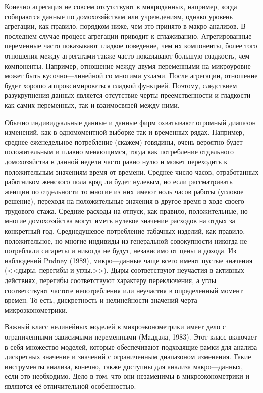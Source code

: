 	
	Конечно агрегация не совсем отсутствуют в микроданных, например, когда собираются данные по домохозяйствам или учреждениям, однако уровень агрегации, как правило, порядком ниже, чем это принято в макро анализов. В последнем случае процесс агрегации приводит к сглаживанию. Агрегированные переменные часто показывают гладкое поведение, чем их компоненты, более того отношения между агрегатами также часто показывают большую гладкость, чем компоненты. Например, отношение между двумя переменными на микроуровне может быть кусочно---линейной со многими узлами. После агрегации, отношение будет хорошо аппроксимироваться гладкой функцией. Поэтому, следствием разукрупнения данных является отсутствие черты преемственности и гладкости как самих переменных, так и взаимосвязей между ними.
	
	
	Обычно индивидуальные данные и данные фирм охватывают огромный диапазон изменений, как в одномоментной выборке так и временных рядах. Например, среднее еженедельное потребление (скажем) говядины, очень вероятно будет положительным и плавно меняющимся, тогда как потребление отдельного домохозяйства в данной недели часто равно нулю и может переходить к положительным значениям время от времени. Среднее число часов, отработанных работником женского пола вряд ли будет нулевым, но если рассматривать женщин по отдельности то многие из них имеют ноль часов работы (угловое решение), переходя на положительные значения в другое время в ходе своего трудового стажа. Средние расходы на отпуск, как правило, положительные, но многие домохозяйства могут иметь нулевое значение расходов на отдых за конкретный год. Среднедушевое потребление табачных изделий, как правило, положительное, но многие индивиды из генеральной совокупности никогда не потребляли сигареты и никогда не будут, независимо от цены и дохода. Из наблюдений Pudney (1989), микро---данные чаще всего имеют пустые значения (<<дыры, перегибы и углы.>>). Дыры соответствуют неучастия в активных действиях, перегибы соответствуют характеру переключения, а углы соответствуют частоте непотребления или неучастия в определенный момент времен. То есть, дискретность и нелинейности значений черта микроэконометрики.
	
	
	Важный класс нелинейных моделей в микроэконометрики имеет дело с ограниченными зависимыми переменными (Маддала, 1983). Этот класс включает в себя множество моделей, которые обеспечивают подходящие рамки для анализа дискретных значение и значений с ограниченным диапазоном изменения. Такие инструменты анализа, конечно, также доступны для анализа макро---данных, если это необходимо. Дело в том, что они незаменимы в микроэконометрики и являются её отличительной особенностью.


